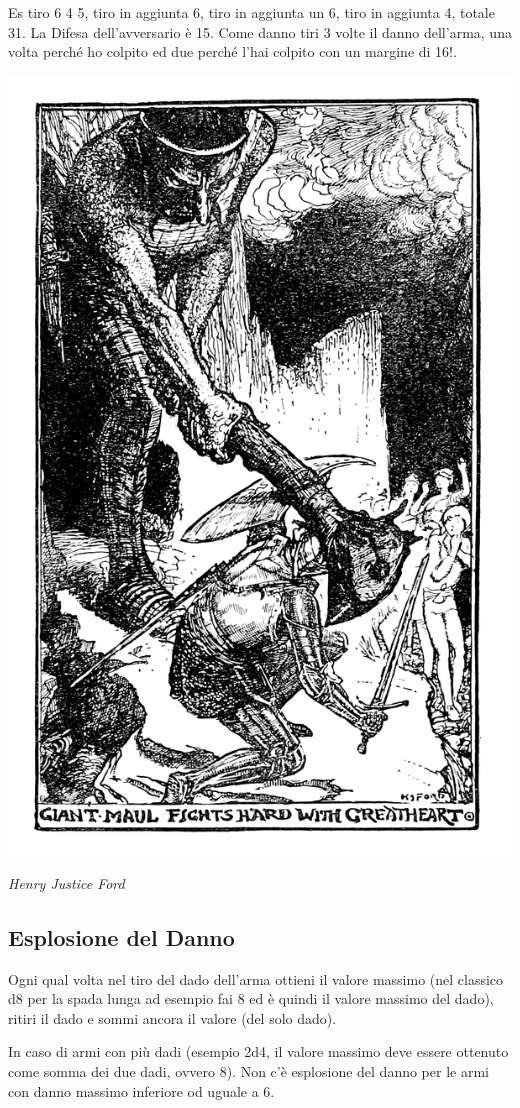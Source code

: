 \begin{multicols}{2}
\begin{changemargin}{0.3cm}{0.3cm}\begin{tcolorbox}[title = Esempio Tiro Critico]
Es tiro 6 4 5, tiro in aggiunta 6, tiro in aggiunta un 6, tiro in aggiunta 4, totale 31. La Difesa dell'avversario è 15. Come danno tiri 3 volte il danno dell'arma, una volta perché ho colpito ed due perché l'hai colpito con un margine di 16!.
\end{tcolorbox}\end{changemargin}


\begin{center}
	\includegraphics[width=0.6\linewidth]{immagini/esplosionedanno.png}

	\emph{Henry Justice Ford}
\end{center}

\subsection{Esplosione del Danno}\label{esplosionedeldanno}

Ogni qual volta nel tiro del dado dell'arma ottieni il valore massimo (nel classico d8 per la spada lunga ad esempio fai 8 ed è quindi il valore massimo del dado), ritiri il dado e sommi ancora il valore (del solo dado).

In caso di armi con più dadi (esempio 2d4, il valore massimo deve essere ottenuto come somma dei due dadi, ovvero 8). Non c'è esplosione del danno per le armi con danno massimo inferiore od uguale a 6.


\end{multicols}
